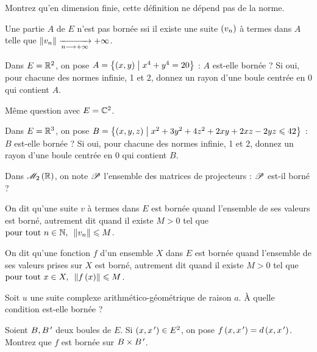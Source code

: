 \begin{exo}
Montrez qu'en dimension finie, cette définition ne dépend pas de la norme.
\end{exo}

\begin{prop}
Une partie \(A\) de \(E\) n'est pas bornée ssi il existe une suite \(\left(v_n\right)\) à termes dans \(A\) telle que \(\norme{v_n}\tendqd{n\to\pinf}\pinf\).
\end{prop}

\begin{exo}
Dans \(E=\mathbb{R}^2\), on pose \(A=\left\lbrace\left(x,y\right)\;\middle|\; x^4+y^4=20\right\rbrace\) : \(A\) est-elle bornée ? Si oui, pour chacune des normes infinie, 1 et 2, donnez un rayon d'une boule centrée en \(0\) qui contient \(A\).
\end{exo}

\begin{exo}
Même question avec \(E=\mathbb{C}^2\).
\end{exo}

\begin{exo}
Dans \(E=\mathbb{R}^3\), on pose \(B=\left\lbrace\left(x,y,z\right)\;\middle|\; x^2+3y^2+4z^2+2xy+2xz-2yz\leqslant42\right\rbrace\) : \(B\) est-elle bornée ? Si oui, pour chacune des normes infinie, 1 et 2, donnez un rayon d'une boule centrée en \(0\) qui contient \(B\).
\end{exo}

\begin{exo}
Dans \(\M{2}[\R]\), on note \(\mathscr{P}\) l'ensemble des matrices de projecteurs : \(\mathscr{P}\) est-il borné ?
\end{exo}

\begin{defi}
On dit qu'une suite \(v\) à termes dans \(E\) est bornée quand l'ensemble de ses valeurs est borné, autrement dit quand il existe \(M>0\) tel que \(\quantifs{\tpt n\in\N}\norme{v_n}\leq M\).

On dit qu'une fonction \(f\) d'un ensemble \(X\) dans \(E\) est bornée quand l'ensemble de ses valeurs prises sur \(X\) est borné, autrement dit quand il existe \(M>0\) tel que \(\quantifs{\tpt x\in X}\norme{f\paren{x}}\leq M\).
\end{defi}

\begin{exo}
Soit \(u\) une suite complexe arithmético-géométrique de raison \(a\). À quelle condition est-elle bornée ?
\end{exo}

\begin{exo}
Soient \(B,B^{\,\prime}\) deux boules de \(E\). Si \(\left(x,x^{\,\prime}\right)\in E^2\), on pose \(f\left(x,x^{\,\prime}\right)=d\left(x,x^{\,\prime}\right)\). Montrez que \(f\) est bornée sur \(B\times B^{\,\prime}\).
\end{exo}

